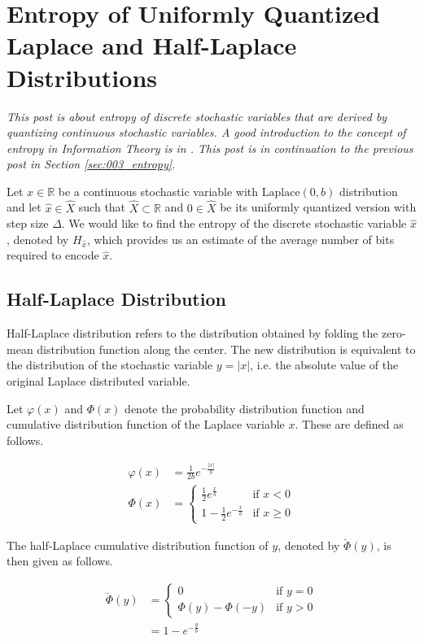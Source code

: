 \section{Entropy of Uniformly Quantized Laplace and Half-Laplace Distributions}
\label{sec:004_entropy}

\emph{This post is about entropy of discrete stochastic variables that are derived by quantizing continuous stochastic variables. A good introduction to the concept of entropy in Information Theory is in \cite{Cover2012}. This post is in continuation to the previous post in Section \ref{sec:003_entropy}.}

Let $x \in \mathbb{R}$ be a continuous stochastic variable with $\text{Laplace}(0, b)$ distribution and let $\hat{x} \in \hat{X}$ such that $\hat{X} \subset \mathbb{R}$ and $0 \in \hat{X}$ be its uniformly quantized version with step size $\Delta$. We would like to find the entropy of the discrete stochastic variable $\hat{x}$, denoted by $H_{\hat{x}}$, which provides us an estimate of the average number of bits required to encode $\hat{x}$.

\subsection{Half-Laplace Distribution}

Half-Laplace distribution refers to the distribution obtained by folding the zero-mean distribution function along the center. The new distribution is equivalent to the distribution of the stochastic variable $y = |x|$, i.e. the absolute value of the original Laplace distributed variable.

Let $\varphi(x)$ and $\Phi(x)$ denote the probability distribution function and cumulative distribution function of the Laplace variable $x$. These are defined as follows.

\begin{align}\varphi(x) &= \frac{1}{2b} e^{-\frac{|x|}{b}} \\ \Phi(x) &= \begin{cases} \frac{1}{2} e^{\frac{x}{b}} & \text{if $x < 0$} \\ 1 - \frac{1}{2} e^{-\frac{x}{b}} & \text{if $x \geq 0$}\end{cases}\end{align}

The half-Laplace cumulative distribution function of $y$, denoted by $\breve{\Phi}(y)$, is then given as follows.

\begin{align} \breve{\Phi}(y) &= \begin{cases} 0 & \text{if $y = 0$} \\ \Phi(y) - \Phi(-y) & \text{if $y > 0$}\end{cases} \\ &= 1 - e^{-\frac{y}{b}} \label{eqn:le} \end{align}

